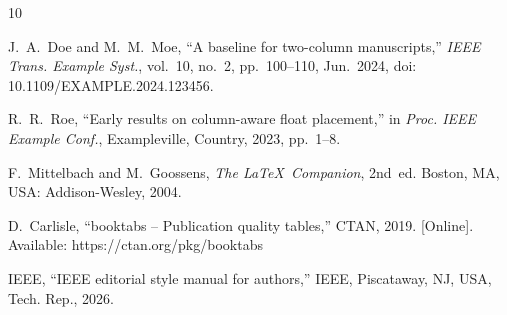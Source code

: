 \documentclass[journal,10pt]{IEEEtran}
\begin{document}
\begin{thebibliography}{10}

J.~A.~Doe and M.~M.~Moe, ``A baseline for two-column manuscripts,''
\emph{IEEE Trans. Example Syst.}, vol.~10, no.~2, pp.~100--110, Jun.~2024,
doi: 10.1109/EXAMPLE.2024.123456.

R.~R.~Roe, ``Early results on column-aware float placement,'' in
\emph{Proc. IEEE Example Conf.}, Exampleville, Country, 2023, pp.~1--8.

F.~Mittelbach and M.~Goossens, \emph{The \LaTeX\ Companion}, 2nd~ed.
Boston, MA, USA: Addison-Wesley, 2004.

D.~Carlisle, ``booktabs -- Publication quality tables,'' CTAN, 2019.
[Online]. Available: https://ctan.org/pkg/booktabs

IEEE, ``IEEE editorial style manual for authors,'' IEEE, Piscataway, NJ,
USA, Tech. Rep., 2026.

\end{thebibliography}
\end{document}
